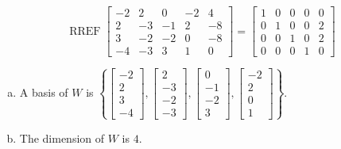 \begin{exerciseAnswer} 


\[\operatorname{RREF} \left[\begin{array}{ccccc}
-2 & 2 & 0 & -2 & 4 \\
2 & -3 & -1 & 2 & -8 \\
3 & -2 & -2 & 0 & -8 \\
-4 & -3 & 3 & 1 & 0
\end{array}\right] = \left[\begin{array}{ccccc}
1 & 0 & 0 & 0 & 0 \\
0 & 1 & 0 & 0 & 2 \\
0 & 0 & 1 & 0 & 2 \\
0 & 0 & 0 & 1 & 0
\end{array}\right] \]


\begin{enumerate}[(a)]
\item A basis of \(W\) is \( \left\{ \left[\begin{array}{c}
-2 \\
2 \\
3 \\
-4
\end{array}\right] , \left[\begin{array}{c}
2 \\
-3 \\
-2 \\
-3
\end{array}\right] , \left[\begin{array}{c}
0 \\
-1 \\
-2 \\
3
\end{array}\right] , \left[\begin{array}{c}
-2 \\
2 \\
0 \\
1
\end{array}\right] \right\} \).
\item The dimension of \(W\) is \( 4 \).
\end{enumerate}
    
\end{exerciseAnswer}
    
